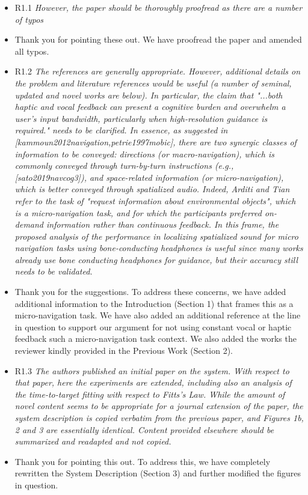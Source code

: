 \documentclass{scrartcl}
\begin{document}
\begin{itemize}
  \item R1.1 \textit{However, the paper should be thoroughly proofread as there are a number of typos}
  \item[] Thank you for pointing these out. We have proofread the paper and amended all typos.

  \item R1.2 \textit{The references are generally appropriate. However, additional details on the problem and literature references would be useful (a number of seminal, updated and novel works are below). In particular, the claim that "...both haptic and vocal feedback can present a cognitive burden and overwhelm a user’s input bandwidth, particularly when high-resolution guidance is required." needs to be clarified.
      In essence, as suggested in [kammoun2012navigation,petrie1997mobic], there are two synergic classes of information to be conveyed: directions (or macro-navigation), which is commonly conveyed through turn-by-turn instructions (e.g., [sato2019navcog3]), and space-related information (or micro-navigation), which is better conveyed through spatialized audio.
      Indeed, Arditi and Tian refer to the task of "request information about environmental objects", which is a micro-navigation task, and for which the participants preferred on-demand information rather than continuous feedback.
In this frame, the proposed analysis of the performance in localizing spatialized sound for micro navigation tasks using bone-conducting headphones is useful since many works already use bone conducting headphones for guidance, but their accuracy still needs to be validated.
}
  \item[] Thank you for the suggestions.
    To address these concerns, we have added additional information to the Introduction (Section 1) that frames this as a micro-navigation task.
    We have also added an additional reference at the line in question to support our argument for not using constant vocal or haptic feedback such a micro-navigation task context.
    We also added the works the reviewer kindly provided in the Previous Work (Section 2).

  \item R1.3 \textit{The authors published an initial paper on the system. With respect to that paper, here the experiments are extended, including also an analysis of the time-to-target fitting with respect to Fitts's Law.
    While the amount of novel content seems to be appropriate for a journal extension of the paper, the system description is copied verbatim from the previous paper, and Figures 1b, 2 and 3 are essentially identical. Content provided elsewhere should be summarized and readapted and not copied.}
  \item[] Thank you for pointing this out.
    To address this, we have completely rewritten the System Description (Section 3) and further modified the figures in question.


\end{itemize}
\end{document}
